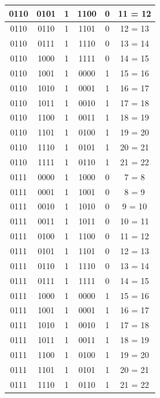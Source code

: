 \documentclass{exam}
\begin{document}
\begin{center}
\begin{longtable}{|c|c|c|c|c|c|}
                0110 & 0101 & 1 & 1100 & 0 & 11 = 12 \\ \hline
                0110 & 0110 & 1 & 1101 & 0 & 12 = 13 \\ \hline
                0110 & 0111 & 1 & 1110 & 0 & 13 = 14 \\ \hline
                0110 & 1000 & 1 & 1111 & 0 & 14 = 15 \\ \hline
                0110 & 1001 & 1 & 0000 & 1 & 15 = 16 \\ \hline
                0110 & 1010 & 1 & 0001 & 1 & 16 = 17 \\ \hline
                0110 & 1011 & 1 & 0010 & 1 & 17 = 18 \\ \hline
                0110 & 1100 & 1 & 0011 & 1 & 18 = 19 \\ \hline
                0110 & 1101 & 1 & 0100 & 1 & 19 = 20 \\ \hline
                0110 & 1110 & 1 & 0101 & 1 & 20 = 21 \\ \hline
                0110 & 1111 & 1 & 0110 & 1 & 21 = 22 \\ \hline
                0111 & 0000 & 1 & 1000 & 0 & 7 = 8 \\ \hline
                0111 & 0001 & 1 & 1001 & 0 & 8 = 9 \\ \hline
                0111 & 0010 & 1 & 1010 & 0 & 9 = 10 \\ \hline
                0111 & 0011 & 1 & 1011 & 0 & 10 = 11 \\ \hline
                0111 & 0100 & 1 & 1100 & 0 & 11 = 12 \\ \hline
                0111 & 0101 & 1 & 1101 & 0 & 12 = 13 \\ \hline
                0111 & 0110 & 1 & 1110 & 0 & 13 = 14 \\ \hline
                0111 & 0111 & 1 & 1111 & 0 & 14 = 15 \\ \hline
                0111 & 1000 & 1 & 0000 & 1 & 15 = 16 \\ \hline
                0111 & 1001 & 1 & 0001 & 1 & 16 = 17 \\ \hline
                0111 & 1010 & 1 & 0010 & 1 & 17 = 18 \\ \hline
                0111 & 1011 & 1 & 0011 & 1 & 18 = 19 \\ \hline
                0111 & 1100 & 1 & 0100 & 1 & 19 = 20 \\ \hline
                0111 & 1101 & 1 & 0101 & 1 & 20 = 21 \\ \hline
                0111 & 1110 & 1 & 0110 & 1 & 21 = 22 \\ \hline

\end{longtable}
\end{center}
\end{document}
